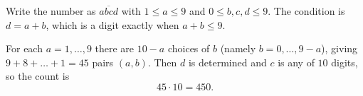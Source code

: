 Write the number as $\overline{abcd}$ with $1\le a\le9$ and $0\le b,c,d\le9$. The condition is $d=a+b$, which is a digit exactly when $a+b\le9$.

For each $a=1,\dots,9$ there are $10-a$ choices of $b$ (namely $b=0,\dots,9-a$), giving $9+8+\dots+1=45$ pairs $(a,b)$. Then $d$ is determined and $c$ is any of $10$ digits, so the count is
\[
45\cdot10=\boxed{450}.
\]
